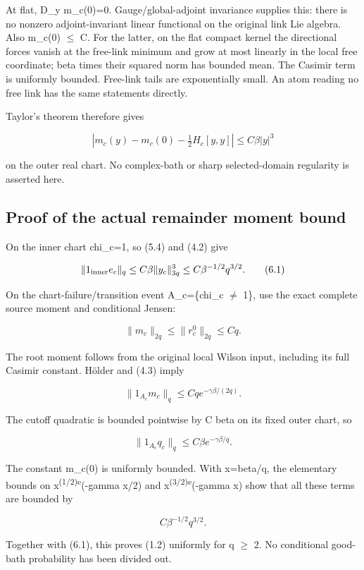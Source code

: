 \documentclass[
  11pt,
]{article}
\begin{document}
At flat, D\_y m\_c(0)=0. Gauge/global-adjoint invariance supplies this:
there is no nonzero adjoint-invariant linear functional on the original
link Lie algebra. Also \textbar m\_c(0)\textbar{} \(\leq\) C. For the
latter, on the flat compact kernel the directional forces vanish at the
free-link minimum and grow at most linearly in the local free
coordinate; beta times their squared norm has bounded mean. The Casimir
term is uniformly bounded. Free-link tails are exponentially small. An
atom reading no free link has the same statements directly.

Taylor's theorem therefore gives

\[
 |m_c(y)-m_c(0)-\tfrac12H_c[y,y]|
 \le C\beta|y|^3
\tag{5.4}
\]

on the outer real chart. No complex-bath or sharp selected-domain
regularity is asserted here.

\hypertarget{proof-of-the-actual-remainder-moment-bound}{%
\subsection{Proof of the actual remainder moment
bound}\label{proof-of-the-actual-remainder-moment-bound}}

On the inner chart chi\_c=1, so (5.4) and (4.2) give

\[
 \|1_{\rm inner}e_c\|_q
 \le C\beta\|y_c\|_{3q}^3
 \le C\beta^{-1/2}q^{3/2}.
\tag{6.1}
\]

On the chart-failure/transition event A\_c=\{chi\_c \(\neq\) 1\}, use
the exact complete source moment and conditional Jensen:

\[
 \|m_c\|_{2q}\le\|r_c^0\|_{2q}\le Cq.
\tag{6.2}
\]

The root moment follows from the original local Wilson input, including
its full Casimir constant. Hölder and (4.3) imply

\[
 \|1_{A_c}m_c\|_q\le Cq e^{-\gamma\beta/(2q)}.
\]

The cutoff quadratic is bounded pointwise by C beta on its fixed outer
chart, so

\[
 \|1_{A_c}q_c\|_q\le C\beta e^{-\gamma\beta/q}.
\]

The constant m\_c(0) is uniformly bounded. With x=beta/q, the elementary
bounds on x\textsuperscript{(1/2)e}(-gamma x/2) and
x\textsuperscript{(3/2)e}(-gamma x) show that all these terms are
bounded by

\[
 C\beta^{-1/2}q^{3/2}.
\]

Together with (6.1), this proves (1.2) uniformly for q \(\geq\) 2. No
conditional good-bath probability has been divided out.
\end{document}
